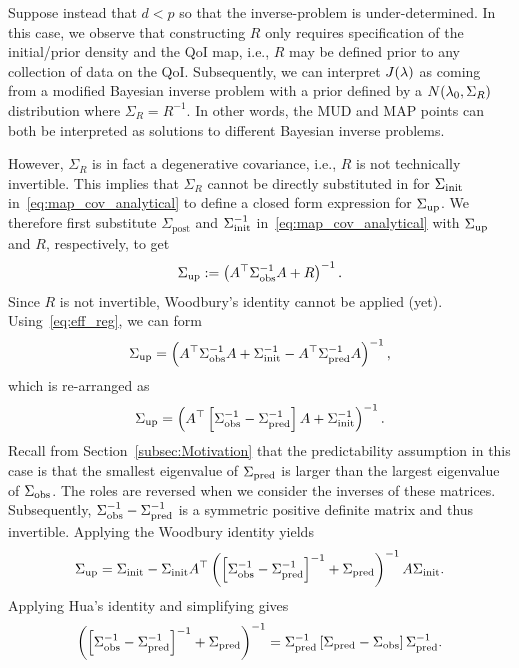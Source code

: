 Suppose instead that $d<p$ so that the inverse-problem is under-determined.
In this case, we observe that constructing $R$ only requires specification of the initial/prior density and the QoI map, i.e., $R$ may be defined prior to any collection of data on the QoI.
Subsequently, we can interpret $J(\lambda)$ as coming from a modified Bayesian inverse problem with a prior defined by a $N(\lambda_0,\Sigma_R)$ distribution where $\Sigma_R=R^{-1}$.
In other words, the MUD and MAP points can both be interpreted as solutions to different Bayesian inverse problems.

However, $\Sigma_R$ is in fact a degenerative covariance, i.e., $R$ is not technically invertible.
This implies that $\Sigma_R$ cannot be directly substituted in for $\Sigma_\text{init}$ in~\eqref{eq:map_cov_analytical} to define a closed form expression for $\Sigma_\text{up}$.
We therefore first substitute  $\Sigma_\text{post}$ and $\Sigma_\text{init}^{-1}$ in~\eqref{eq:map_cov_analytical} with $\Sigma_\text{up}$  and $R$, respectively, to get
\begin{equation}
	\Sigma_\text{up} := \left(A^\top \Sigma_\text{obs}^{-1} A + R\right)^{-1}.
\end{equation}
Since $R$ is not invertible, Woodbury's identity cannot be applied (yet).
Using~\eqref{eq:eff_reg}, we can form
\begin{equation}
	\updatedCov = \left(A^\top \observedCov^{-1} A +  \initialCov^{-1} - \nolinebreak A^\top \predictedCov^{-1} A\right)^{-1},
\end{equation}
which is re-arranged as
\begin{equation}
	\Sigma_\text{up} = \left(A^\top \left[\Sigma_\text{obs}^{-1} - \Sigma_\text{pred}^{-1}\right]A + \Sigma_\text{init}^{-1}\right)^{-1}.
\end{equation}
Recall from Section~\ref{subsec:Motivation} that the predictability assumption in this case is that the smallest eigenvalue of $\Sigma_\text{pred}$ is larger than the largest eigenvalue of $\Sigma_\text{obs}$.
The roles are reversed when we consider the inverses of these matrices.
Subsequently, $\Sigma_\text{obs}^{-1}-\Sigma_\text{pred}^{-1}$ is a symmetric positive definite matrix and thus invertible.
Applying the Woodbury identity yields
\begin{equation}\label{eq:updated_cov_almost}
	\Sigma_\text{up} = \Sigma_\text{init} - \Sigma_\text{init} A^\top\left( \left[\Sigma_\text{obs}^{-1} - \Sigma_\text{pred}^{-1}\right]^{-1} + \Sigma_\text{pred}\right)^{-1} A\Sigma_\text{init}.
\end{equation}
Applying Hua's identity and simplifying gives
\begin{equation}\label{eq:Hua}
	\left( \left[\Sigma_\text{obs}^{-1} - \Sigma_\text{pred}^{-1}\right]^{-1} + \Sigma_\text{pred}\right)^{-1} = \Sigma_\text{pred}^{-1}\left[\Sigma_\text{pred} - \Sigma_\text{obs}\right]\Sigma_\text{pred}^{-1}.
\end{equation}
